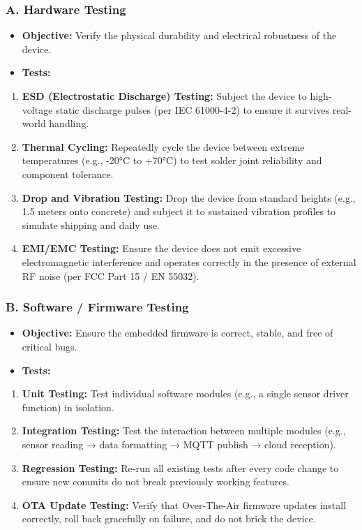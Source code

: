 \subsubsection{A. Hardware Testing}
\begin{itemize}
  \item   \textbf{Objective:} Verify the physical durability and electrical robustness of the device.
  \item   \textbf{Tests:}
\end{itemize}
\begin{enumerate}
  \item \textbf{ESD (Electrostatic Discharge) Testing:} Subject the device to high-voltage static discharge pulses (per IEC 61000-4-2) to ensure it survives real-world handling.
  \item \textbf{Thermal Cycling:} Repeatedly cycle the device between extreme temperatures (e.g., -20°C to +70°C) to test solder joint reliability and component tolerance.
  \item \textbf{Drop and Vibration Testing:} Drop the device from standard heights (e.g., 1.5 meters onto concrete) and subject it to sustained vibration profiles to simulate shipping and daily use.
  \item \textbf{EMI/EMC Testing:} Ensure the device does not emit excessive electromagnetic interference and operates correctly in the presence of external RF noise (per FCC Part 15 / EN 55032).
\end{enumerate}

\subsubsection{B. Software / Firmware Testing}
\begin{itemize}
  \item   \textbf{Objective:} Ensure the embedded firmware is correct, stable, and free of critical bugs.
  \item   \textbf{Tests:}
\end{itemize}
\begin{enumerate}
  \item \textbf{Unit Testing:} Test individual software modules (e.g., a single sensor driver function) in isolation.
  \item \textbf{Integration Testing:} Test the interaction between multiple modules (e.g., sensor reading → data formatting → MQTT publish → cloud reception).
  \item \textbf{Regression Testing:} Re-run all existing tests after every code change to ensure new commits do not break previously working features.
  \item \textbf{OTA Update Testing:} Verify that Over-The-Air firmware updates install correctly, roll back gracefully on failure, and do not brick the device.
\end{enumerate}

